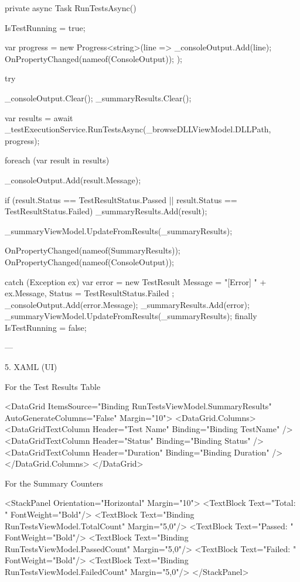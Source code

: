 private async Task RunTestsAsync()
{
    IsTestRunning = true;

    var progress = new Progress<string>(line =>
    {
        _consoleOutput.Add(line);
        OnPropertyChanged(nameof(ConsoleOutput));
    });

    try
    {
        _consoleOutput.Clear();
        _summaryResults.Clear();

        var results = await _testExecutionService.RunTestsAsync(_browseDLLViewModel.DLLPath, progress);

        foreach (var result in results)
        {
            _consoleOutput.Add(result.Message);

            if (result.Status == TestResultStatus.Passed || result.Status == TestResultStatus.Failed)
                _summaryResults.Add(result);
        }

        _summaryViewModel.UpdateFromResults(_summaryResults);

        OnPropertyChanged(nameof(SummaryResults));
        OnPropertyChanged(nameof(ConsoleOutput));
    }
    catch (Exception ex)
    {
        var error = new TestResult
        {
            Message = "[Error] " + ex.Message,
            Status = TestResultStatus.Failed
        };
        _consoleOutput.Add(error.Message);
        _summaryResults.Add(error);
        _summaryViewModel.UpdateFromResults(_summaryResults);
    }
    finally
    {
        IsTestRunning = false;
    }
}


---

5. XAML (UI)

For the Test Results Table

<DataGrid ItemsSource="{Binding RunTestsViewModel.SummaryResults}" AutoGenerateColumns="False" Margin="10">
    <DataGrid.Columns>
        <DataGridTextColumn Header="Test Name" Binding="{Binding TestName}" />
        <DataGridTextColumn Header="Status" Binding="{Binding Status}" />
        <DataGridTextColumn Header="Duration" Binding="{Binding Duration}" />
    </DataGrid.Columns>
</DataGrid>

For the Summary Counters

<StackPanel Orientation="Horizontal" Margin="10">
    <TextBlock Text="Total: " FontWeight="Bold"/>
    <TextBlock Text="{Binding RunTestsViewModel.TotalCount}" Margin="5,0"/>
    <TextBlock Text="Passed: " FontWeight="Bold"/>
    <TextBlock Text="{Binding RunTestsViewModel.PassedCount}" Margin="5,0"/>
    <TextBlock Text="Failed: " FontWeight="Bold"/>
    <TextBlock Text="{Binding RunTestsViewModel.FailedCount}" Margin="5,0"/>
</StackPanel>


